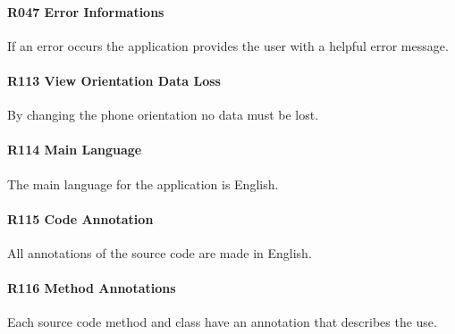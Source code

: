 \paragraph{R047 Error Informations}
If an error occurs the application provides the user with a helpful error message.
\paragraph{R113 View Orientation Data Loss}
By changing the phone orientation no data must be lost.
\paragraph{R114 Main Language}
The main language for the application is English.
\paragraph{R115 Code Annotation}
All annotations of the source code are made in English.
\paragraph{R116 Method Annotations}
Each source code method and class have an annotation that describes the use.